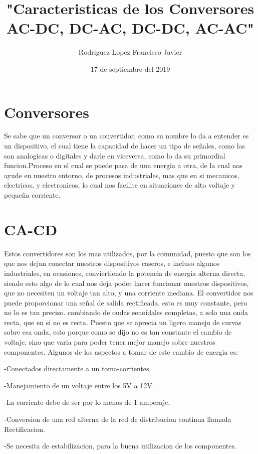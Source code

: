 \documentclass[12pt]{article}
\title{\textbf{"Caracteristicas de los Conversores AC-DC, DC-AC, DC-DC, AC-AC"}}
\author{Rodriguez Lopez Francisco Javier}
\date{17 de septiembre del 2019}
\begin{document}
\maketitle

\section{Conversores}

Se sabe que un conversor o un convertidor, como su nombre lo da a entender es un dispositivo, el cual tiene la capacidad de hacer un tipo de señales, como las son  analogicas o digitales y darle en viceversa, como lo da su primordial funcion.Proceso en el cual se puede pasa de una energia a otra, de la cual nos ayude en nuestro entorno, de procesos industriales, mas que en si mecanicos, electricos, y electronicos, lo cual nos facilite en situaciones de alto voltaje y pequeña corriente.



\section{CA-CD}
Estos convertidores son los mas utilizados, por la comunidad, puesto que son los que nos dejan conectar nuestros dispositivos caseros, e incluso algunos industriales, en ocasiones, conviertiendo la potencia de energia alterna directa, siendo esto algo de lo cual nos deja poder hacer funcionar nuestros dispositivos, que no necesiten un voltaje tan alto, y una corriente mediana. El convertidor nos puede proporcionar una señal de salida rectificada, esto es muy constante, pero no lo es tan preciso. cambiando de ondas senoidales completas, a solo una onda recta, que en si no es recta. Puesto que se aprecia un ligero manejo de curvas sobre esa onda, esto porque como se dijo no es tan constante el cambio de voltaje, sino que varia para poder tener mejor manejo sobre nuestros componentes.
Algunos de los aspectos a tomar de este cambio de energia es:

-Conectados directamente a un toma-corrientes.

-Manejamiento de un voltaje entre los 5V a 12V.

-La corriente debe de ser por lo menos de 1 amperaje.

-Conversion de una red alterna de la red de distribucion continua llamada Rectificacion.

-Se necesita de estabilizacion, para la buena utilizacion de los componentes.
\end{document}
